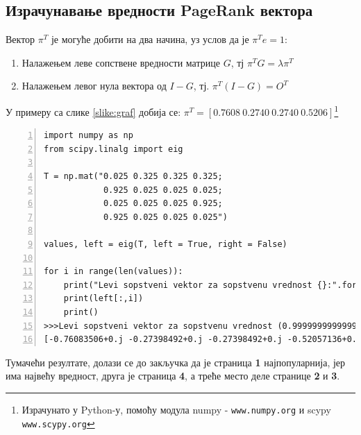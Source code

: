 \documentclass[11pt, serbianc, english, titlepage]{article}
\begin{document}
       \subsection{Израчунавање вредности PageRank\texttrademark{} вектора}
       Вектор $\pi^{T}$ је могуће добити на два начина, уз услов да је $\pi^{T}e = 1$:
       \begin{enumerate}
       \item Налажењем леве сопствене вредности матрице $G$, тј $\pi^{T}G=\lambda \pi^{T}$
       \item Налажењем левог нула вектора од $I - G$, тј. $\pi^{T}(I-G)=O^{T}$
       \end{enumerate}
       У примеру са слике \ref{slike:graf} добија се: $\pi^{T} = \left [0.7608\: 0.2740\: 0.2740\: 0.5206 \right ]$\footnote{Израчунато у Python-у, помоћу модула numpy - \texttt{www.numpy.org} и scypy \texttt{www.scypy.org}} 
       \begin{lstlisting}[caption=Израчунавање леве сопствене вредности, label={lst:eigen}, numbers=left]
import numpy as np
from scipy.linalg import eig

T = np.mat("0.025 0.325 0.325 0.325;
            0.925 0.025 0.025 0.025; 
            0.025 0.025 0.025 0.925; 
            0.925 0.025 0.025 0.025")
            
values, left = eig(T, left = True, right = False)

for i in range(len(values)):
	print("Levi sopstveni vektor za sopstvenu vrednost {}:".format(values[i]))
	print(left[:,i])
	print()
>>>Levi sopstveni vektor za sopstvenu vrednost (0.9999999999999998+0j):
[-0.76083506+0.j -0.27398492+0.j -0.27398492+0.j -0.52057136+0.j]
        \end{lstlisting}
        Тумачећи резултате, долази се до закључка да је страница \textbf{1} најпопуларнија, јер има највећу вредност, друга је страница \textbf{4}, а треће место деле странице \textbf{2} и \textbf{3}.
\pagebreak		
\end{document}
